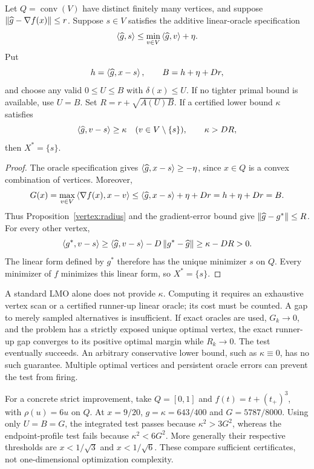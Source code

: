 \begin{proposition}
\label{vertex:certificate}
Let $Q=\operatorname{conv}(V)$ have distinct finitely many vertices,
and suppose $\left\|\widehat g-\nabla f(x)\right\|\le r$. Suppose
$s\in V$ satisfies the additive linear-oracle specification
\begin{equation}\label{vertex:oracle}
 \left\langle\widehat g,s\right\rangle\le\min_{v\in V}\left\langle\widehat g,v\right\rangle+\eta.
\end{equation}
Put
\begin{equation}\label{vertex:oraclebound}
 h=\left\langle\widehat g,x-s\right\rangle,\qquad B=h+\eta+Dr,
\end{equation}
and choose any valid $0\le U\le B$ with $\delta(x)\le U$. If no
tighter primal bound is available, use $U=B$. Set
$R=r+\sqrt{A(U)B}$. If a certified lower bound $\kappa$ satisfies
\begin{equation}\label{vertex:margin}
 \left\langle\widehat g,v-s\right\rangle\ge\kappa\quad(v\in V\setminus\{s\}),
 \qquad \kappa>DR,
\end{equation}
then $X^*=\{s\}$.
\end{proposition}
\begin{proof}
The oracle specification gives
$\left\langle\widehat g,x-s\right\rangle\ge-\eta$, since $x\in Q$ is a convex
combination of vertices. Moreover,
\[
 G(x)=\max_{v\in V}\left\langle\nabla f(x),x-v\right\rangle
 \le \left\langle\widehat g,x-s\right\rangle+\eta+Dr
 =h+\eta+Dr=B.
\]
Thus Proposition~\ref{vertex:radius} and the gradient-error bound
give $\left\|\widehat g-g^*\right\|\le R$. For every other vertex,
\[
 \left\langle g^*,v-s\right\rangle
 \ge\left\langle\widehat g,v-s\right\rangle-D\left\|g^*-\widehat g\right\|
 \ge\kappa-DR>0.
\]
The linear form defined by $g^*$ therefore has the unique minimizer
$s$ on $Q$. Every minimizer of $f$ minimizes this linear form, so
$X^*=\{s\}$.
\end{proof}

A standard LMO alone does not provide $\kappa$. Computing it requires
an exhaustive vertex scan or a certified runner-up linear oracle; its
cost must be counted. A gap to merely sampled alternatives is
insufficient. If exact oracles are used, $G_k\to0$, and the problem has
a strictly exposed unique optimal vertex, the exact runner-up gap
converges to its positive optimal margin while $R_k\to0$. The test
eventually succeeds. An arbitrary conservative lower bound, such as
$\kappa\equiv0$, has no such guarantee. Multiple optimal vertices
and persistent oracle errors can prevent the test from firing.

For a concrete strict improvement, take $Q=[0,1]$ and
$f(t)=t+(t_+)^3$, with $\rho(u)=6u$ on $Q$. At $x=9/20$,
$g=\kappa=643/400$ and $G=5787/8000$. Using only $U=B=G$,
the integrated test passes because $\kappa^2>3G^2$, whereas the
endpoint-profile test fails because $\kappa^2<6G^2$. More generally
their respective thresholds are $x<1/\sqrt3$ and $x<1/\sqrt6$.
These compare sufficient certificates, not one-dimensional
optimization complexity.

